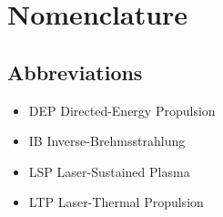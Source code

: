 \chapter*{Nomenclature}
\setlength{\columnsep}{1cm}
\newenvironment{nomtable}
    {
        \centering
        \tabularx{\columnwidth}{r>{\raggedright\arraybackslash}X}
    }
    {
        \endtabularx
    }
\newenvironment{nomlist}
    {
        \begin{itemize}[leftmargin=1.5cm]
            \raggedright
            \setlength{\parsep}{0pt}
            \setlength{\itemsep}{-4pt}
    }
    {
        \end{itemize}
    }
\begin{multicols*}{2}
    \section*{Abbreviations}

    \begin{nomlist}
        \item[DEP]              Directed-Energy Propulsion
        \item[IB]               Inverse-Brehmsstrahlung 
        \item[LSP]              Laser-Sustained Plasma
        \item[LTP]              Laser-Thermal Propulsion
    \end{nomlist}


\end{multicols*}
